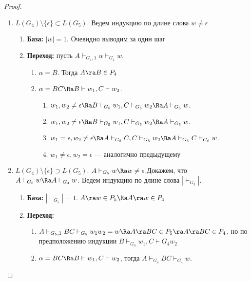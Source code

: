 \begin{proof}\indent
    \begin{enumerate}
        \item \(L(G_4) \setminus \{\epsilon\} \subset L(G_5)\). Ведем индукцию по длине слова \(w \ne \epsilon\)
        \begin{enumerate}
            \item[] \textbf{База:} \(|w| = 1\). Очевидно выводим за один шаг
            \item[] \textbf{Переход:} пусть \(A \vdash_{G_4, 1} \alpha \vdash_{G_4} w\).
            \begin{enumerate}
                \item \(\alpha = B\). Тогда \(A \ra B \in P_4\)
                \item \(\alpha = BC \Ra B \vdash w_1, C \vdash w_2\).
                
                \begin{enumerate}
                    \item \(w_1, w_2 \ne \epsilon \Ra B \vdash_{G_5} w_1, C \vdash_{G_5} w_2 \Ra A \vdash_{G_5} w\).
                    \item \(w_1, w_2 \ne \epsilon \Ra B \vdash_{G_5} w_1, C \vdash_{G_5} w_2 \Ra A \vdash_{G_5} w\).
                    \item \(w_1 = \epsilon, w_2 \ne \epsilon \Ra A \vdash_{G_5} C, C \vdash_{G_5} w_2 \Ra A \vdash_{G_5} C \vdash_{G_6} w\).
                    \item \(w_1 \ne \epsilon, w_2 = \epsilon\) --- аналогично предыдущему
                \end{enumerate}
                
            \end{enumerate}
        \end{enumerate}
        \item \(L(G_4) \setminus \{\epsilon\} \supset L(G_5)\). \(A \vdash_{G_5} w \Ra w \ne \epsilon\).Докажем, что \(A \vdash_{G_5} w \Ra A \vdash_{G_4} w\). Ведем индукцию по длине слова \(|\vdash_{G_5}|\). 
        \begin{enumerate}
            \item[] \textbf{База:} \(|\vdash_{G_5}| = 1\). \(A \ra w \in P_5 \Ra A \ra w \in P_4\)
            \item[] \textbf{Переход:}
            \begin{enumerate}
                \item \(A \vdash_{G_5, 1} BC \vdash_{G_5} w_1w_2 = w \Ra A \ra BC \in P_5 \ra A \ra BC \in P_4\), но по предположению индукции \(B \vdash_{G_4} w_1, C \vdash{G_4} w_2\)
                \item \(\alpha = BC \Ra B \vdash w_1, C \vdash w_2\), тогда \(A \vdash_{G_4} BC \vdash_{G_4} w\).
                

\end{enumerate}
\end{enumerate}
\end{enumerate}
\end{proof}
